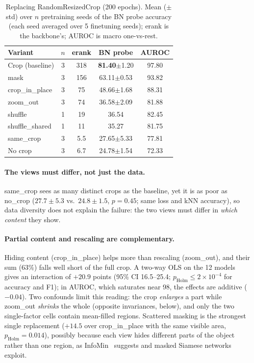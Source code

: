 \documentclass[10pt,twocolumn,letterpaper]{article}
\newcommand{\pmstd}[1]{{\scriptsize$\pm$#1}}
\begin{document}
\begin{table}[t]
\centering
\small
\setlength\tabcolsep{3pt}
\begin{tabular}{lcccc}
\toprule
Variant & $n$ & erank & BN probe & AUROC \\
\midrule
Crop (baseline) & 3 & 318 & \textbf{81.40}\pmstd{1.20} & 97.80 \\
mask & 3 & 156 & 63.11\pmstd{0.53} & 93.82 \\
crop\_in\_place & 3 & 75 & 48.66\pmstd{1.68} & 88.31 \\
zoom\_out & 3 & 74 & 36.58\pmstd{2.09} & 81.88 \\
shuffle & 1 & 19 & 36.54 & 82.45 \\
shuffle\_shared & 1 & 11 & 35.27 & 81.75 \\
same\_crop & 3 & 5.5 & 27.65\pmstd{5.33} & 77.81 \\
No crop & 3 & 6.7 & 24.78\pmstd{1.54} & 72.33 \\
\bottomrule
\end{tabular}
\caption{Replacing RandomResizedCrop (200 epochs). Mean (\pmstd{std}) over $n$ pretraining seeds of the BN probe accuracy (each seed averaged over 5 finetuning seeds); erank is the backbone's; AUROC is macro one-vs-rest.}
\label{tab:crop}
\end{table}

\paragraph{The views must differ, not just the data.}
same\_crop sees as many distinct crops as the baseline, yet it is as poor as no\_crop ($27.7\pm5.3$ vs.\ $24.8\pm1.5$, $p{=}0.45$; same loss and kNN accuracy), so data diversity does not explain the failure: the two views must differ in \emph{which content} they show.

\paragraph{Partial content and rescaling are complementary.}
Hiding content (crop\_in\_place) helps more than rescaling (zoom\_out), and their sum (63\%) falls well short of the full crop. A two-way OLS on the 12 models gives an interaction of $+20.9$ points (95\% CI 16.5--25.4; $p_\text{Holm}\le2\!\times\!10^{-4}$ for accuracy and F1); in AUROC, which saturates near 98, the effects are additive ($-0.04$). Two confounds limit this reading: the crop \emph{enlarges} a part while zoom\_out \emph{shrinks} the whole (opposite invariances, below), and only the two single-factor cells contain mean-filled regions.
Scattered masking is the strongest single replacement ($+14.5$ over crop\_in\_place with the same visible area, $p_\text{Holm}{=}0.014$), possibly because each view hides different parts of the object rather than one region, as InfoMin~\cite{tian2020infomin} suggests and masked Siamese networks~\cite{assran2022msn} exploit.
\end{document}
